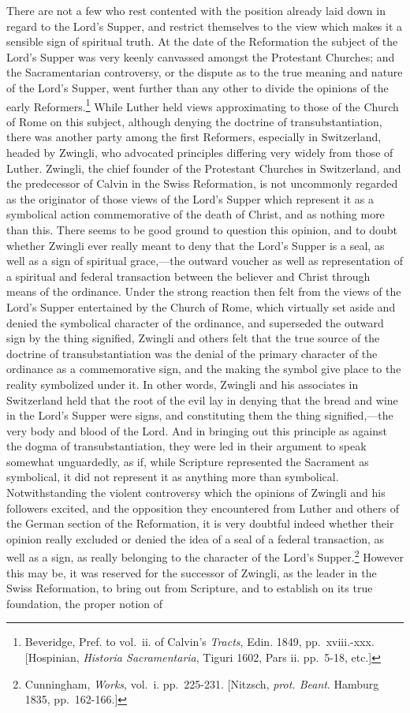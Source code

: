 \documentclass[english,]{book}
\begin{document}
There are not a few who rest contented with the position already laid down in regard to the Lord's Supper, and restrict themselves to the view which makes it a sensible sign of spiritual truth. At the date of the Reformation the subject of the Lord's Supper was very keenly canvassed amongst the Protestant Churches; and the Sacramentarian controversy, or the dispute as to the true meaning and nature of the Lord's Supper, went further than any other to divide the opinions of the early Reformers.\footnote{Beveridge, Pref. to vol.~ii. of Calvin's \emph{Tracts}, Edin. 1849, pp.~xviii.-xxx. {[}Hospinian, \emph{Historia Sacramentaria}, Tiguri 1602, Pars ii. pp.~5-18, etc.{]}} While Luther held views approximating to those of the Church of Rome on this subject, although denying the doctrine of transubstantiation, there was another party among the first Reformers, especially in Switzerland, headed by Zwingli, who advocated principles differing very widely from those of Luther. Zwingli, the chief founder of the Protestant Churches in Switzerland, and the predecessor of Calvin in the Swiss Reformation, is not uncommonly regarded as the originator of those views of the Lord's Supper which represent it as a symbolical action commemorative of the death of Christ, and as nothing more than this. There seems to be good ground to question this opinion, and to doubt whether Zwingli ever really meant to deny that the Lord's Supper is a seal, as well as a sign of spiritual grace,---the outward voucher as well as representation of a spiritual and federal transaction between the believer and Christ through means of the ordinance. Under the strong reaction then felt from the views of the Lord's Supper entertained by the Church of Rome, which virtually set aside and denied the symbolical character of the ordinance, and superseded the outward sign by the thing signified, Zwingli and others felt that the true source of the doctrine of transubstantiation was the denial of the primary character of the ordinance as a commemorative sign, and the making the symbol give place to the reality symbolized under it. In other words, Zwingli and his associates in Switzerland held that the root of the evil lay in denying that the bread and wine in the Lord's Supper were signs, and constituting them the thing signified,---the very body and blood of the Lord. And in bringing out this principle as against the dogma of transubstantiation, they were led in their argument to speak somewhat unguardedly, as if, while Scripture represented the Sacrament as symbolical, it did not represent it as anything more than symbolical. Notwithstanding the violent controversy which the opinions of Zwingli and his followers excited, and the opposition they encountered from Luther and others of the German section of the Reformation, it is very doubtful indeed whether their opinion really excluded or denied the idea of a seal of a federal transaction, as well as a sign, as really belonging to the character of the Lord's Supper.\footnote{Cunningham, \emph{Works}, vol.~i. pp.~225-231. {[}Nitzsch, \emph{prot. Beant}. Hamburg 1835, pp.~162-166.{]}} However this may be, it was reserved for the successor of Zwingli, as the leader in the Swiss Reformation, to bring out from Scripture, and to establish on its true foundation, the proper notion of 
\end{document}
